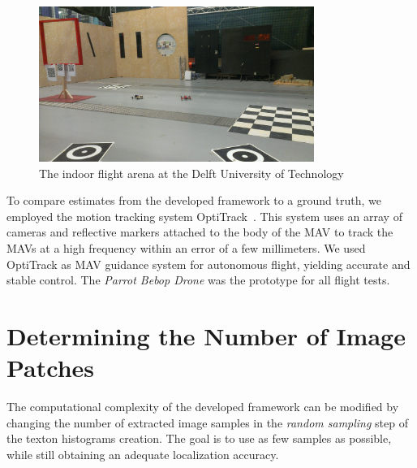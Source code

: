 \documentclass[11pt]{report}
\begin{document}
\begin{figure}[t]
  \centering
 \includegraphics[width=0.8\textwidth]{cyberzoo} 
  \caption{The indoor flight arena at the Delft University of Technology
  }
    \label{fig:cyberzoo}
\end{figure}

To compare estimates from the developed framework to a ground truth,
we employed the motion tracking system OptiTrack~\cite{opti}. This
system uses an array of cameras and reflective markers attached to the
body of the MAV to track the MAVs at a high frequency within an error
of a few millimeters. We used OptiTrack as MAV guidance system for
autonomous flight, yielding accurate and stable control. The
\emph{Parrot Bebop Drone} was the prototype for all flight tests.




\section{Determining the Number of Image Patches}
\label{sec:numtextons}

The computational complexity of the developed framework can be
modified by changing the number of extracted image samples in the
\emph{random sampling} step of the texton histograms creation.
The goal is to use as few samples as possible, while still obtaining
an adequate localization accuracy.
\end{document}
